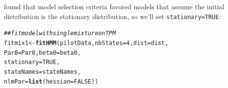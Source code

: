 \documentclass[12pt]{article}\usepackage[]{graphicx}\usepackage[]{xcolor}
\makeatletter
\newcommand{\hlnum}[1]{\textcolor[rgb]{0.686,0.059,0.569}{#1}}%
\newcommand{\hlcom}[1]{\textcolor[rgb]{0.678,0.584,0.686}{\textit{#1}}}%
\newcommand{\hlstd}[1]{\textcolor[rgb]{0.345,0.345,0.345}{#1}}%
\newcommand{\hlkwb}[1]{\textcolor[rgb]{0.69,0.353,0.396}{#1}}%
\newcommand{\hlkwc}[1]{\textcolor[rgb]{0.333,0.667,0.333}{#1}}%
\newcommand{\hlkwd}[1]{\textcolor[rgb]{0.737,0.353,0.396}{\textbf{#1}}}%
\newenvironment{kframe}{%
 \def\at@end@of@kframe{}%
 \ifinner\ifhmode%
  \def\at@end@of@kframe{\end{minipage}}%
  \begin{minipage}{\columnwidth}%
 \fi\fi%
 \def\FrameCommand##1{\hskip\@totalleftmargin \hskip-\fboxsep
 \colorbox{shadecolor}{##1}\hskip-\fboxsep
     \hskip-\linewidth \hskip-\@totalleftmargin \hskip\columnwidth}%
 \MakeFramed {\advance\hsize-\width
   \@totalleftmargin\z@ \linewidth\hsize
   \@setminipage}}%
 {\par\unskip\endMakeFramed%
 \at@end@of@kframe}
\newenvironment{knitrout}{}{} %
\makeatother
\begin{document}
\noindent \cite{IsojunnoEtAl2017} found that model selection criteria favored models that assume the initial distribution is the stationary distribution, so we'll set \verb|stationary=TRUE|:
\begin{knitrout}
\color{fgcolor}\begin{kframe}
\begin{alltt}
\hlcom{## fit model with single mixture on TPM}
\hlstd{fitmix1} \hlkwb{<-} \hlkwd{fitHMM}\hlstd{(pilotData,} \hlkwc{nbStates}\hlstd{=}\hlnum{4}\hlstd{,} \hlkwc{dist}\hlstd{=dist,}
                  \hlkwc{Par0}\hlstd{=Par0,} \hlkwc{beta0}\hlstd{=beta0,}
                  \hlkwc{stationary}\hlstd{=}\hlnum{TRUE}\hlstd{,}
                  \hlkwc{stateNames}\hlstd{=stateNames,}
                  \hlkwc{nlmPar}\hlstd{=}\hlkwd{list}\hlstd{(}\hlkwc{hessian}\hlstd{=}\hlnum{FALSE}\hlstd{))}
\end{alltt}
\end{kframe}
\end{knitrout}
\end{document}
